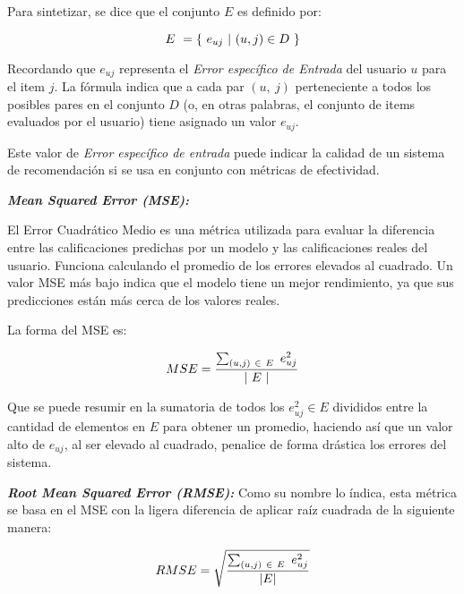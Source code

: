 \begin{itemize}
\begin{itemize}[label=$\diamond$]
            Para sintetizar, se dice que el conjunto $E$ es definido por: 

            \begin{equation}
                E \ =  \{ \  e_{uj} \ |  \ (u,j) \in D \ \}
                \addequation{Definición del Conjunto de Entradas $E$}
            \end{equation}
            
            Recordando que $e_{uj}$ representa el \textit{Error específico de Entrada} del usuario $u$ para el item $j$. La fórmula indica que a cada par $( u, \ j )$ perteneciente a todos los posibles pares en el conjunto $D$ (o, en otras palabras, el conjunto de items evaluados por el usuario) tiene asignado un valor $e_{uj}$. 

            Este valor de \textit{Error específico de entrada} puede indicar la calidad de un sistema de recomendación si se usa en conjunto con métricas de efectividad.

            \textit{\textbf{Mean Squared Error (MSE): }} 
            
            El Error Cuadrático Medio es una métrica utilizada para evaluar la diferencia entre las calificaciones predichas por un modelo y las calificaciones reales del usuario. Funciona calculando el promedio de los errores elevados al cuadrado. Un valor MSE más bajo indica que el modelo tiene un mejor rendimiento, ya que sus predicciones están más cerca de los valores reales.
            
            La forma del MSE es: 

            \begin{equation}
                MSE = \frac{\sum_{(u, j) \ \in \ E \ }{e^2_{uj}}}{| \ E \ |}
                \addequation{Definición de Mean Squared Error}
            \end{equation}

            Que se puede resumir en la sumatoria de todos los $e_{uj}^2 \in E$ divididos entre la cantidad de elementos en $E$ para obtener un promedio, haciendo así que un valor alto de $e_{uj}$, al ser elevado al cuadrado, penalice de forma drástica los errores del sistema.

            \textbf{\textit{Root Mean Squared Error (RMSE): }} Como su nombre lo índica, esta métrica se basa en el MSE con la ligera diferencia de aplicar raíz cuadrada de la siguiente manera: 

            \begin{equation}
                RMSE = \sqrt{\frac{\sum_{(u,j) \ \in \ E}{\ e^2_{uj}}}{ \ |E| \ }}
                \addequation{Definición de Root Mean Squared Error}
            \end{equation}
            

\end{itemize}
\end{itemize}
